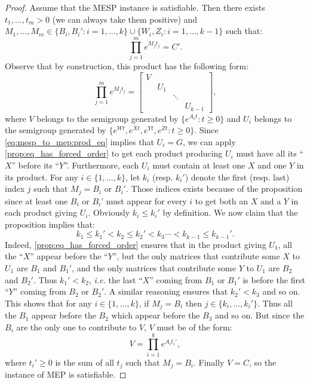 \begin{proof}
Assume that the MESP instance is satisfiable. Then there exists $t_1,\ldots,t_m>0$ (we can always take them positive)
and $M_1,\ldots,M_m\in\big\{B_i,B_i':i=1,\ldots,k\}\cup\big\{W_i,Z_i:i=1,\ldots,k-1\big\}$
such that:
\begin{equation}\label{eq:mesp_to_mep:prod_eq}
\prod_{j=1}^me^{M_jt_j}=C'.
\end{equation}
Observe that by construction, this product has the following form:
\[\prod_{j=1}^me^{M_jt_j}=\begin{bmatrix}V&&&\\&U_1&&\\&&\ddots&\\&&&U_{k-1}\end{bmatrix},\]
where $V$ belongs to the semigroup generated by $\{e^{A_it}:t\geqslant0\}$ and $U_i$ belongs
to the semigroup generated by $\{e^{Wt},e^{Xt},e^{Yt},e^{Zt}:t\geqslant0\}$. Since
\eqref{eq:mesp_to_mep:prod_eq} implies that $U_i=G$, we can apply \cref{prop:eq_has_forced_order}
to get each product producing $U_i$ must have all its ``$X$'' before its ``$Y$''. Furthermore, each $U_i$
must contain at least one $X$ and one $Y$ in its product. For any $i\in\{1,\ldots,k\}$,
let $k_i$ (resp. $k_i'$) denote
the first (resp. last) index $j$ such that $M_j=B_i\text{ or }B_i'$. Those indices exists because
of the proposition since at least one $B_i$ or $B_i$' must appear for every $i$
to get both an $X$ and a $Y$ in each product giving $U_i$. Obviously $k_i\leqslant k_i'$
by definition. We now claim that the proposition implies that:
\[k_1\leqslant k_1'<k_2\leqslant k_2'<k_3\cdots<k_{k-1}\leqslant k_{k-1}'.\]
Indeed, \cref{prop:eq_has_forced_order} ensures that in the product giving $U_1$,
all the ``$X$'' appear before the ``$Y$'',
but the only matrices that contribute some $X$ to $U_1$ are $B_1$ and $B_1'$,
and the only matrices that contribute some $Y$ to $U_1$ are $B_2$ and $B_2'$.
Thus $k_1'<k_2$, \emph{i.e.} the last ``$X$'' coming from $B_1$ or $B_1'$ is before the first ``$Y$''
coming from $B_2$ or $B_2'$. A similar reasoning ensures that $k_2'<k_3$ and so on.
This shows that for any $i\in\{1,\ldots,k\}$, if $M_j=B_i$ then $j\in\{k_i,\ldots,k_i'\}$. Thus all
the $B_1$ appear before the $B_2$ which appear before the $B_3$ and so on.
But since the $B_i$ are the only one to contribute to $V$, $V$ must be of the form:
\[V=\prod_{i=1}^ke^{A_it_i'},\]
where $t_i'\geqslant0$ is the sum of all $t_j$ such that $M_j=B_i$.
Finally $V=C$, so the instance of MEP is satisfiable.

\end{proof}
